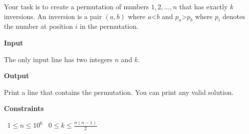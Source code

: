 Your task is to create a permutation of numbers $1,2,\dots,n$ that has exactly $k$ inversions.
An inversion is a pair $(a,b)$ where $a$<$b$ and $p_a$>$p_b$ where $p_i$ denotes the number at position $i$ in the permutation.

\vspace{0.3cm}\noindent\textbf{Input}

The only input line has two integers $n$ and $k$.

\vspace{0.3cm}\noindent\textbf{Output}

Print a line that contains the permutation. You can print any valid solution.

\vspace{0.3cm}\noindent\textbf{Constraints}

\textbullet\ $1 \le n \le 10^6$
\textbullet\ $0 \le k \le \frac{n(n-1)}{2}$